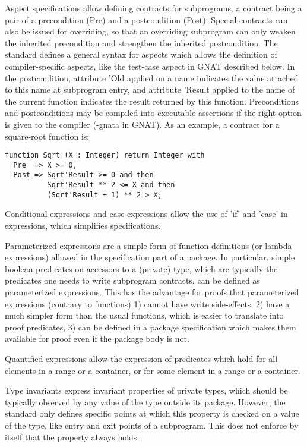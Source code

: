\documentclass{article}
\begin{document}
Aspect specifications allow defining contracts for subprograms, a contract
being a pair of a precondition (Pre) and a postcondition (Post). Special
contracts can also be issued for overriding, so that an overriding subprogram
can only weaken the inherited precondition and strengthen the inherited
postcondition. The standard defines a general syntax for aspects which allows
the definition of compiler-specific aspects, like the test-case aspect in GNAT
described below. In the postcondition, attribute 'Old applied on a name
indicates the value attached to this name at subprogram entry, and attribute
'Result applied to the name of the current function indicates the result
returned by this function. Preconditions and postconditions may be compiled
into executable assertions if the right option is given to the compiler (-gnata
in GNAT).  As an example, a contract for a square-root function is:

\begin{verbatim}
function Sqrt (X : Integer) return Integer with
  Pre  => X >= 0,
  Post => Sqrt'Result >= 0 and then
          Sqrt'Result ** 2 <= X and then
          (Sqrt'Result + 1) ** 2 > X;
\end{verbatim}

Conditional expressions and case expressions allow the use of 'if' and 'case'
in expressions, which simplifies specifications.

Parameterized expressions are a simple form of function definitions (or lambda
expressions) allowed in the specification part of a package. In particular,
simple boolean predicates on accessors to a (private) type, which are typically
the predicates one needs to write subprogram contracts, can be defined as
parameterized expressions. This has the advantage for proofs that parameterized
expressions (contrary to functions) 1) cannot have write side-effects, 2) have
a much simpler form than the usual functions, which is easier to translate into
proof predicates, 3) can be defined in a package specification which makes them
available for proof even if the package body is not.

Quantified expressions allow the expression of predicates which hold for all
elements in a range or a container, or for some element in a range or a
container.

Type invariants express invariant properties of private types, which should be
typically observed by any value of the type outside its package. However, the
standard only defines specific points at which this property is checked on a
value of the type, like entry and exit points of a subprogram. This does not
enforce by itself that the property always holds.
\end{document}
